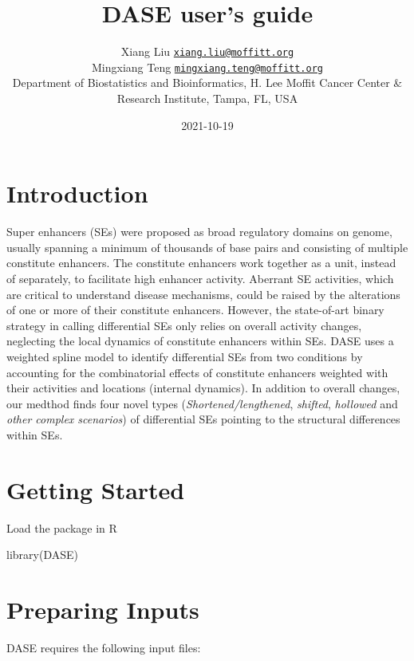 \documentclass[
]{article}
\title{DASE user's guide}
\author{Xiang Liu
\href{mailto:xiang.liu@moffitt.org}{\nolinkurl{xiang.liu@moffitt.org}}\\
Mingxiang Teng
\href{mailto:mingxiang.teng@moffitt.org}{\nolinkurl{mingxiang.teng@moffitt.org}}\\
Department of Biostatistics and Bioinformatics, H. Lee Moffit Cancer
Center \&\\
Research Institute, Tampa, FL, USA}
\date{2021-10-19}
\newenvironment{Shaded}{\begin{snugshade}}{\end{snugshade}}
\newcommand{\FunctionTok}[1]{\textcolor[rgb]{0.00,0.00,0.00}{#1}}
\newcommand{\NormalTok}[1]{#1}
\begin{document}
\maketitle

{
\setcounter{tocdepth}{2}
\tableofcontents
}
\hypertarget{introduction}{%
\section{Introduction}\label{introduction}}

Super enhancers (SEs) were proposed as broad regulatory domains on
genome, usually spanning a minimum of thousands of base pairs and
consisting of multiple constitute enhancers. The constitute enhancers
work together as a unit, instead of separately, to facilitate high
enhancer activity. Aberrant SE activities, which are critical to
understand disease mechanisms, could be raised by the alterations of one
or more of their constitute enhancers. However, the state-of-art binary
strategy in calling differential SEs only relies on overall activity
changes, neglecting the local dynamics of constitute enhancers within
SEs. DASE uses a weighted spline model to identify differential SEs from
two conditions by accounting for the combinatorial effects of constitute
enhancers weighted with their activities and locations (internal
dynamics). In addition to overall changes, our medthod finds four novel
types (\emph{Shortened/lengthened}, \emph{shifted}, \emph{hollowed} and
\emph{other complex scenarios}) of differential SEs pointing to the
structural differences within SEs.

\hypertarget{getting-started}{%
\section{Getting Started}\label{getting-started}}

Load the package in R

\begin{Shaded}
\begin{Highlighting}[]
\FunctionTok{library}\NormalTok{(DASE)}
\end{Highlighting}
\end{Shaded}

\hypertarget{preparing-inputs}{%
\section{Preparing Inputs}\label{preparing-inputs}}

DASE requires the following input files:
\end{document}
